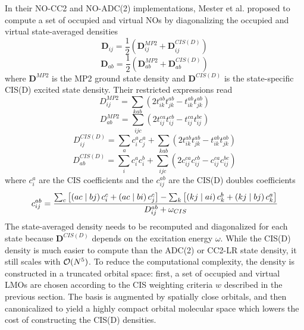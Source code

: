 In their NO-CC2 and NO-ADC(2) implementations, Mester et al. \cite{Mes2017, Mes2018, Mes2019} proposed to compute a set of occupied and virtual NOs by diagonalizing the occupied and virtual state-averaged densities
\begin{equation}
\mathbf{D}_{ij} = \frac{1}{2} \left( \mathbf{D}_{ij}^{MP2} + \mathbf{D}_{ij}^{CIS(D)} \right)
\end{equation}
\begin{equation}
\mathbf{D}_{ab} = \frac{1}{2} \left( \mathbf{D}_{ab}^{MP2} + \mathbf{D}_{ab}^{CIS(D)} \right)
\end{equation}
\noindent where $\mathbf{D}^{MP2}$ is the MP2 ground state density and $\mathbf{D}^{CIS(D)}$ is the state-specific CIS(D) excited state density. Their restricted expressions read
\begin{equation}
D_{ij}^{MP2} = \sum_{kab} \left( 2 t_{ik}^{ab} t_{jk}^{ab} - t_{ik}^{ab} t_{jk}^{ab} \right) 
\end{equation}
\begin{equation}
D_{ab}^{MP2} = \sum_{ijc} \left( 2t_{ij}^{ca} t_{ij}^{cb} - t_{ij}^{ca}t_{ij}^{bc} \right)
\end{equation}
\begin{equation}
D_{ij}^{CIS(D)} = \sum_{a} c_i^a c_j^a  + \sum_{kab} \left( 2 t_{ik}^{ab} t_{jk}^{ab} - t_{ik}^{ab} t_{jk}^{ab} \right) 
\end{equation}
\begin{equation}
D_{ab}^{CIS(D)} = \sum_{i} c_i^a c_i^b + \sum_{ijc} \left( 2c_{ij}^{ca} c_{ij}^{cb} - c_{ij}^{ca}c_{ij}^{bc} \right)
\end{equation}
\noindent where $c_i^a$ are the CIS coefficients and the $c_{ij}^{ab}$ are the CIS(D) doubles coefficients
\begin{equation}
c_{ij}^{ab} = \frac{\sum_c \left[ \left( ac \mid bj \right) c_i^c + \left( ac \mid bi \right) c_j^c \right] - \sum_k \left[ \left( kj \mid ai \right) c_k^b + \left( kj \mid bj \right) c_k^a \right]}{D_{ij}^{ab} + \omega_{CIS}}
\end{equation}
\noindent The state-averaged density needs to be recomputed and diagonalized for each state because $\mathbf{D}^{CIS(D)}$ depends on the excitation energy $\omega$. While the CIS(D) density is much easier to compute than the ADC(2) or CC2-LR state density, it still scales with $\mathcal{O}(N^{5})$. To reduce the computational complexity, the density is constructed in a truncated orbital space: first, a set of occupied and virtual LMOs are chosen according to the CIS weighting criteria $w$ described in the previous section. The basis is augmented by spatially close orbitals, and then canonicalized to yield a highly compact orbital molecular space which lowers the cost of constructing the CIS(D) densities. 

